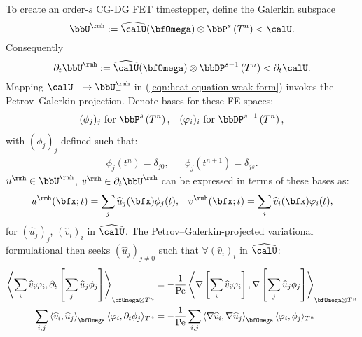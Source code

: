 \begin{example}
        To create an order-$s$ CG-DG FET timestepper, define the Galerkin subspace
        \begin{equation}
            \bbU^{\rmh}  :=  \widehat{\calU}(\bfOmega)\otimes\bbP^{s}\left(T^{n}\right)  <  \calU.
        \end{equation}
        Consequently
        \begin{equation}
            \partial_{t}\bbU^{\rmh}  :=  \widehat{\calU}(\bfOmega)\otimes\bbDP^{s - 1}\left(T^{n}\right)  <  \partial_{t}\calU.
        \end{equation}
        Mapping $\calU_{-}  \mapsto  \bbU^{\rmh}_{-}$ in (\ref{eqn:heat equation weak form}) invokes the Petrov--Galerkin projection. Denote bases for these FE spaces:
        \begin{align}
            (\phi_{j})_{j}     \text{ for }  \bbP^{s}\left(T^{n}\right),         &&
            (\varphi_{i})_{i}  \text{ for }  \bbDP^{s - 1}\left(T^{n}\right),
        \end{align}
        with $(\phi_{j})_{j}$ defined such that:
        \begin{align}
            \phi_{j}\left(t^{n}\right)      =  \delta_{j0},  &&
            \phi_{j}\left(t^{n + 1}\right)  =  \delta_{js}.
        \end{align}
        $u^{\rmh}  \in  \bbU^{\rmh}$, $v^{\rmh}  \in  \partial_{t}\bbU^{\rmh}$ can be expressed in terms of these bases as:
        \begin{align}
            u^{\rmh}(\bfx; t)  =  \sum_{j}\widehat{u}_{j}(\bfx)\phi_{j}(t),  &&
            v^{\rmh}(\bfx; t)  =  \sum_{i}\widehat{v}_{i}(\bfx)\varphi_{i}(t),
        \end{align}
        for $\left(\widehat{u}_{j}\right)_{j}$, $\left(\widehat{v}_{i}\right)_{i}$ in $\widehat{\calU}$. The Petrov--Galerkin-projected variational formulational then seeks $\left(\widehat{u}_{j}\right)_{j \neq 0}$ such that $\forall  \left(\widehat{v}_{i}\right)_{i}$ in $\widehat{\calU}$:
        \begin{align}
            \left\langle\sum_{i}\widehat{v}_{i}\varphi_{i}, \partial_{t}\left[\sum_{j}\widehat{u}_{j}\phi_{j}\right]\right\rangle_{\bfOmega\otimes T^{n}}  &=  - \frac{1}{\rmPe}\left\langle\nabla\left[\sum_{i}\widehat{v}_{i}\varphi_{i}\right], \nabla\left[\sum_{j}\widehat{u}_{j}\phi_{j}\right]\right\rangle_{\bfOmega\otimes T^{n}}  \\
            \sum_{i, j}\left\langle\widehat{v}_{i}, \widehat{u}_{j}\right\rangle_{\bfOmega}\langle\varphi_{i}, \partial_{t}\phi_{j}\rangle_{T^{n}}  &=  - \frac{1}{\rmPe}\sum_{i, j}\left\langle\nabla\widehat{v}_{i}, \nabla\widehat{u}_{j}\right\rangle_{\bfOmega}\langle\varphi_{i}, \phi_{j}\rangle_{T^{n}}

\end{align}
\end{example}
